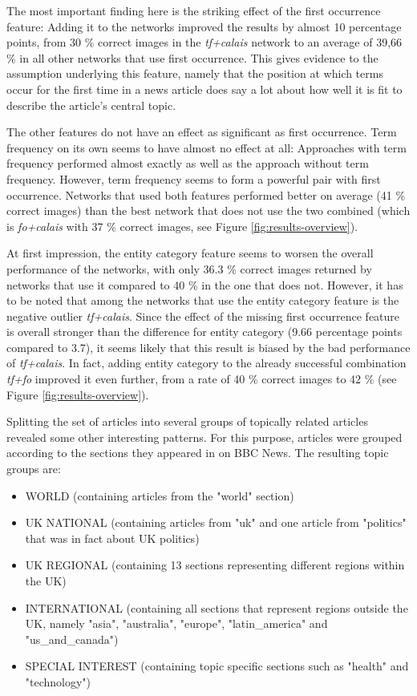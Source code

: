 \documentclass[11pt,a4paper,twoside]{article}
\begin{document}
The most important finding here is the striking effect of the first occurrence feature: Adding it to the networks improved the results by almost 10 percentage points, from 30 \% correct images in the \emph{tf+calais} network to an average of 39,66 \% in all other networks that use first occurrence. This gives evidence to the assumption underlying this feature, namely that the position at which terms occur for the first time in a news article does say a lot about how well it is fit to describe the article's central topic.

The other features do not have an effect as significant as first occurrence. Term frequency on its own seems to have almost no effect at all: Approaches with term frequency performed almost exactly as well as the approach without term frequency. However, term frequency seems to form a powerful pair with first occurrence. Networks that used both features performed better on average (41 \% correct images) than the best network that does not use the two combined (which is \emph{fo+calais} with 37 \% correct images, see Figure \ref{fig:results-overview}).

At first impression, the entity category feature seems to worsen the overall performance of the networks, with only 36.3 \% correct images returned by networks that use it compared to 40 \% in the one that does not. However, it has to be noted that among the networks that use the entity category feature is the negative outlier \emph{tf+calais}. Since the effect of the missing first occurrence feature is overall stronger than the difference for entity category (9.66 percentage points compared to 3.7), it seems likely that this result is biased by the bad performance of \emph{tf+calais}. In fact, adding entity category to the already successful combination \emph{tf+fo} improved it even further, from a rate of 40 \% correct images to 42 \% (see Figure \ref{fig:results-overview}).

\bigskip

Splitting the set of articles into several groups of topically related articles revealed some other interesting patterns. For this purpose, articles were grouped according to the sections they appeared in on BBC News. The resulting topic groups are:

\begin{itemize}
    \setlength\itemsep{0em}
    \item WORLD (containing articles from the "world" section)
    \item UK NATIONAL (containing articles from "uk" and one article from "politics" that was in fact about UK politics)
    \item UK REGIONAL (containing 13 sections representing different regions within the UK)
    \item INTERNATIONAL (containing all sections that represent regions outside the UK, namely "asia", "australia", "europe", "latin\_america" and "us\_and\_canada")
    \item SPECIAL INTEREST (containing topic specific sections such as "health" and "technology")
\end{itemize}
\end{document}
